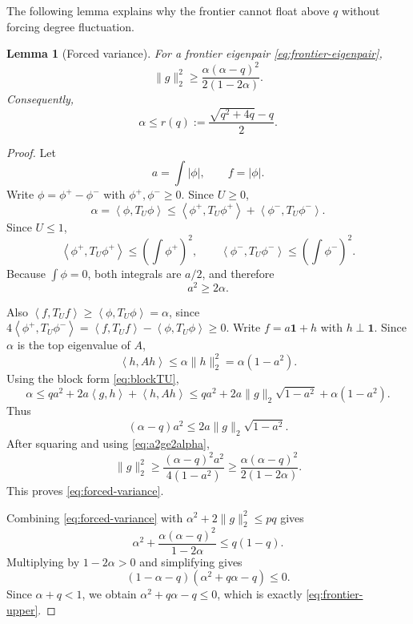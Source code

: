 \documentclass[11pt]{article}
\newtheorem{lemma}[theorem]{Lemma}
\newcommand{\one}{\mathbf 1}
\newcommand{\ip}[2]{\left\langle #1,#2\right\rangle}
\begin{document}
The following lemma explains why the frontier cannot float above $q$
without forcing degree fluctuation.

\begin{lemma}[Forced variance]\label{lem:forced-variance}
For a frontier eigenpair \eqref{eq:frontier-eigenpair},
\begin{equation}\label{eq:forced-variance}
        \|g\|_2^2\ge
        \frac{\alpha(\alpha-q)^2}{2(1-2\alpha)}.
\end{equation}
Consequently,
\begin{equation}\label{eq:frontier-upper}
        \alpha\le r(q):=\frac{\sqrt{q^2+4q}-q}{2}.
\end{equation}
\end{lemma}

\begin{proof}
Let
\[
        a=\int |\phi|,
        \qquad f=|\phi|.
\]
Write $\phi=\phi^+-\phi^-$ with $\phi^+,\phi^-\ge0$.  Since $U\ge0$,
\[
        \alpha=\ip{\phi}{T_U\phi}
        \le \ip{\phi^+}{T_U\phi^+}+\ip{\phi^-}{T_U\phi^-}.
\]
Since $U\le1$,
\[
        \ip{\phi^+}{T_U\phi^+}\le\left(\int\phi^+\right)^2,
        \qquad
        \ip{\phi^-}{T_U\phi^-}\le\left(\int\phi^-\right)^2.
\]
Because $\int\phi=0$, both integrals are $a/2$, and therefore
\begin{equation}\label{eq:a2ge2alpha}
        a^2\ge2\alpha.
\end{equation}

Also $\ip{f}{T_Uf}\ge\ip{\phi}{T_U\phi}=\alpha$, since
$4\ip{\phi^+}{T_U\phi^-}=\ip{f}{T_Uf}-\ip{\phi}{T_U\phi}\ge0$.
Write $f=a\one+h$ with $h\perp\one$.  Since $\alpha$ is the top
eigenvalue of $A$,
\[
        \ip{h}{Ah}\le\alpha\|h\|_2^2=\alpha(1-a^2).
\]
Using the block form \eqref{eq:blockTU},
\[
        \alpha\le qa^2+2a\ip{g}{h}+\ip{h}{Ah}
        \le qa^2+2a\|g\|_2\sqrt{1-a^2}+\alpha(1-a^2).
\]
Thus
\[
        (\alpha-q)a^2\le2a\|g\|_2\sqrt{1-a^2}.
\]
After squaring and using \eqref{eq:a2ge2alpha},
\[
        \|g\|_2^2\ge
        \frac{(\alpha-q)^2a^2}{4(1-a^2)}
        \ge
        \frac{\alpha(\alpha-q)^2}{2(1-2\alpha)}.
\]
This proves \eqref{eq:forced-variance}.

Combining \eqref{eq:forced-variance} with
$\alpha^2+2\|g\|_2^2\le pq$ gives
\[
        \alpha^2+\frac{\alpha(\alpha-q)^2}{1-2\alpha}\le q(1-q).
\]
Multiplying by $1-2\alpha>0$ and simplifying gives
\[
        (1-\alpha-q)(\alpha^2+q\alpha-q)\le0.
\]
Since $\alpha+q<1$, we obtain $\alpha^2+q\alpha-q\le0$, which is exactly
\eqref{eq:frontier-upper}.
\end{proof}
\end{document}
